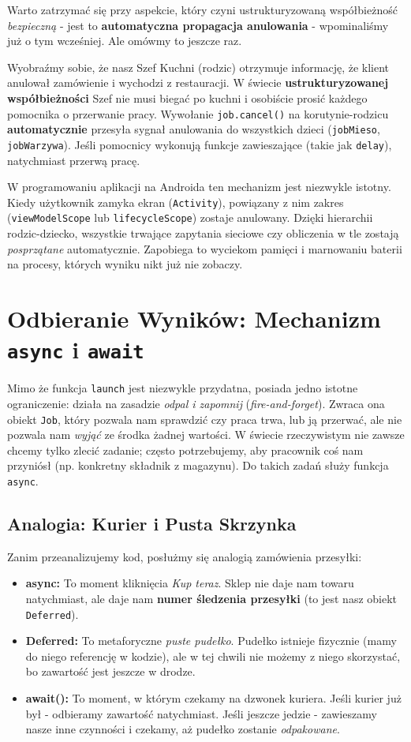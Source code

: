 Warto zatrzymać się przy aspekcie, który czyni ustrukturyzowaną współbieżność \textit{bezpieczną} - jest to \textbf{automatyczna propagacja anulowania} - wpominaliśmy już o tym wcześniej. Ale omówmy to jeszcze raz.

Wyobraźmy sobie, że nasz Szef Kuchni (rodzic) otrzymuje informację, że klient anulował zamówienie i wychodzi z restauracji. W świecie \textbf{ustrukturyzowanej współbieżności} Szef nie musi biegać po kuchni i osobiście prosić każdego pomocnika o przerwanie pracy. Wywołanie \texttt{job.cancel()} na korutynie-rodzicu \textbf{automatycznie} przesyła sygnał anulowania do wszystkich dzieci (\texttt{jobMieso}, \texttt{jobWarzywa}). Jeśli pomocnicy wykonują funkcje zawieszające (takie jak \texttt{delay}), natychmiast przerwą pracę.

W programowaniu aplikacji na Androida ten mechanizm jest niezwykle istotny. Kiedy użytkownik zamyka ekran (\texttt{Activity}), powiązany z nim zakres (\texttt{viewModelScope} lub \texttt{lifecycleScope}) zostaje anulowany. Dzięki hierarchii rodzic-dziecko, wszystkie trwające zapytania sieciowe czy obliczenia w tle zostają \textit{posprzątane} automatycznie. Zapobiega to wyciekom pamięci i marnowaniu baterii na procesy, których wyniku nikt już nie zobaczy.

\section{Odbieranie Wyników: Mechanizm \texttt{async} i \texttt{await}}

Mimo że funkcja \texttt{launch} jest niezwykle przydatna, posiada jedno istotne ograniczenie: działa na zasadzie \textit{odpal i zapomnij} (\textit{fire-and-forget}). Zwraca ona obiekt \texttt{Job}, który pozwala nam sprawdzić czy praca trwa, lub ją przerwać, ale nie pozwala nam \textit{wyjąć} ze środka żadnej wartości. W świecie rzeczywistym nie zawsze chcemy tylko zlecić zadanie; często potrzebujemy, aby pracownik coś nam przyniósł (np. konkretny składnik z magazynu). Do takich zadań służy funkcja \texttt{async}.

\subsection{Analogia: Kurier i Pusta Skrzynka} 
Zanim przeanalizujemy kod, posłużmy się analogią zamówienia przesyłki: 
\begin{itemize} 
    \item \textbf{async:} To moment kliknięcia \textit{Kup teraz}. Sklep nie daje nam towaru natychmiast, ale daje nam \textbf{numer śledzenia przesyłki} (to jest nasz obiekt \texttt{Deferred}). 
    \item \textbf{Deferred:} To metaforyczne \textit{puste pudełko}. Pudełko istnieje fizycznie (mamy do niego referencję w kodzie), ale w tej chwili nie możemy z niego skorzystać, bo zawartość jest jeszcze w drodze. 
    \item \textbf{await():} To moment, w którym czekamy na dzwonek kuriera. Jeśli kurier już był - odbieramy zawartość natychmiast. Jeśli jeszcze jedzie - zawieszamy nasze inne czynności i czekamy, aż pudełko zostanie \textit{odpakowane}. 
\end{itemize}


